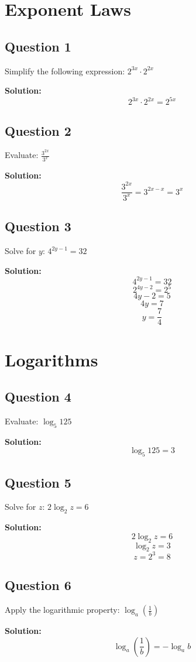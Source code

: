 \documentclass[12pt]{article}
\begin{document}
\section*{Exponent Laws}

\subsection*{Question 1}
Simplify the following expression: $2^{3x} \cdot 2^{2x}$

\textbf{Solution:}
\[2^{3x} \cdot 2^{2x} = 2^{5x}\]

\subsection*{Question 2}
Evaluate: $\frac{3^{2x}}{3^x}$

\textbf{Solution:}
\[\frac{3^{2x}}{3^x} = 3^{2x - x} = 3^x\]

\subsection*{Question 3}
Solve for $y$: $4^{2y-1} = 32$

\textbf{Solution:}
\[4^{2y-1} = 32\]
\[2^{4y-2} = 2^5\]
\[4y - 2 = 5\]
\[4y = 7\]
\[y = \frac{7}{4}\]

\section*{Logarithms}

\subsection*{Question 4}
Evaluate: $\log_5 125$

\textbf{Solution:}
\[\log_5 125 = 3\]

\subsection*{Question 5}
Solve for $z$: $2\log_2 z = 6$

\textbf{Solution:}
\[2\log_2 z = 6\]
\[\log_2 z = 3\]
\[z = 2^3 = 8\]

\subsection*{Question 6}
Apply the logarithmic property: $\log_a \left(\frac{1}{b}\right)$

\textbf{Solution:}
\[\log_a \left(\frac{1}{b}\right) = -\log_a b\]
\end{document}
